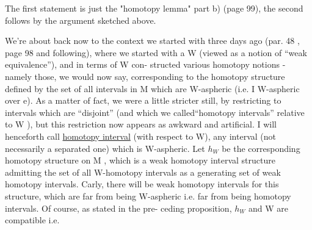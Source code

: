 
The first statement is just  the "homotopy lemma" part b)
(page 99), the second follows by the argument sketched above.

We're about back now  to the context we started with
three days ago (par. 48 , page 98 and following), where we started with
a W (viewed as a notion of ``weak equivalence''), and in terms of W con-%
structed various homotopy notions - namely those, we would now say,
corresponding to the homotopy structure defined by the set of all intervals 
in M which are W-aspheric  (i.e. I  W-aspheric over e\hand{*}). As a matter of 
fact, we were a little stricter still, by restricting to intervals
which are  ``disjoint'' (and which we called``homotopy intervals'' relative
to W ), but this restriction now  appears as awkward and artificial. I
will henceforth call \uline{homotopy interval} (with respect to W), any interval
(not necessarily a separated one) which is W-aspheric. Let $h_W$ be the
corresponding homotopy structure on M , which is a weak homotopy interval
structure admitting the set of all W-homotopy intervals as a generating
set of weak homotopy intervals. \hand{(}Carly, there will be  weak homotopy
intervals for this structure, which are far from being W-aspheric i.e.
far from being homotopy intervals.\hand{)} Of course,  as stated in the pre-%
ceding proposition, $h_W$ and W are  compatible i.e.

